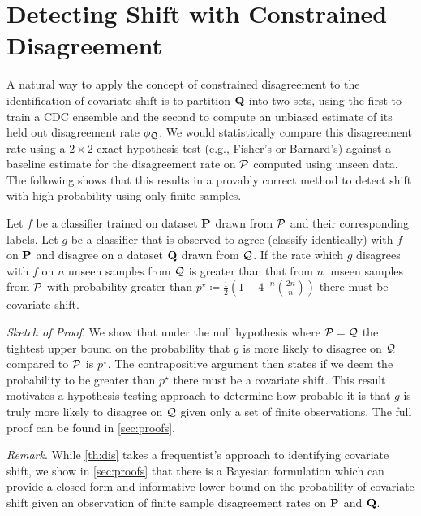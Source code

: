 \section{Detecting Shift with Constrained Disagreement}\label{sec:from-constrained-disagreement-to-detecting-shift-with-hypothesis-tests}
A natural way to apply the concept of constrained disagreement to the identification of covariate shift is
to partition $\mathbf{Q}$ into two sets, using the first to train a CDC ensemble and the second to compute an unbiased estimate
of its held out disagreement rate $\phi_{\mathcal{Q}}$.
We would statistically compare this disagreement rate using a $2\times 2$ exact hypothesis test (e.g., Fisher's or Barnard's) against a baseline estimate for the disagreement rate on $\mathcal{P}$ computed using unseen data.
The following shows that this results in a provably correct method to detect shift with high probability using only finite samples.
\begin{theorem}
    \label{th:dis}
    Let $f$ be a classifier trained on dataset $\mathbf{P}$ drawn from $\mathcal{P}$ and their corresponding labels.
    Let $g$ be a classifier that is observed to agree (classify identically) with $f$ on $\mathbf{P}$ and disagree on a dataset $\mathbf{Q}$ drawn from $\mathcal{Q}$.
    If the rate which $g$ disagrees with $f$ on $n$ unseen samples from $\mathcal{Q}$ is greater than that from $n$ unseen samples from $\mathcal{P}$ with probability greater than $p^\star \coloneqq \frac{1}{2}\left(1- 4^{-n} \binom{2n}{n}\right)$ there must be covariate shift.
\end{theorem}
\textit{Sketch of Proof}.
We show that under the null hypothesis where $\mathcal{P} = \mathcal{Q}$ the tightest upper bound on the probability that $g$ is more likely to disagree on $\mathcal{Q}$ compared to $\mathcal{P}$ is $p^\star$.
The contrapositive argument then states
if we deem the probability to be greater than $p^\star$ there must be a covariate shift.
This result motivates a hypothesis testing approach to determine how probable it is that $g$ is truly more likely to disagree on $\mathcal{Q}$ given only a set of finite observations.
The full proof can be found in \autoref{sec:proofs}.


\textit{Remark}.
While \autoref{th:dis} takes a frequentist's approach to identifying covariate shift, we show in \autoref{sec:proofs} that there is a Bayesian formulation which can provide a closed-form and informative lower bound on the probability
of covariate shift given an observation of finite sample disagreement rates on $\mathbf{P}$ and $\mathbf{Q}$.

